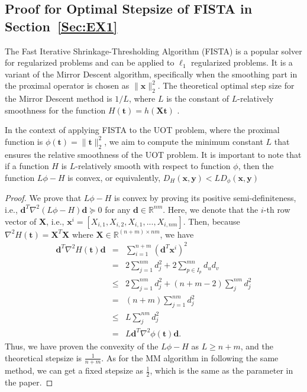 \documentclass[11pt]{article}
\newcommand{\R}{\mathbb{R}}
\newcommand{\mat}[1]{\mathbf{#1}}
\renewcommand{\vec}[1]{\bm{#1}}
\begin{document}
\subsection{Proof for Optimal Stepsize of FISTA in Section~\ref{Sec:EX1}}
The Fast Iterative Shrinkage-Thresholding Algorithm (FISTA)\cite{Beck_2009_SIAMIS} is a popular solver for regularized problems and can be applied to $\ell_1$ regularized problems. It is a variant of the Mirror Descent algorithm, specifically when the smoothing part in the proximal operator is chosen as $\|\vec{x}\|_2^2$. The theoretical optimal step size for the Mirror Descent method is $1/L$, where $L$ is the constant of $L$-relatively smoothness for the function $H(\vec{t}) = h(\mat{X} \vec{t})$ \cite{doi:10.1137/16M1099546}. 

In the context of applying FISTA to the UOT problem, where the proximal function is $\phi(\vec{t}) = \|\vec{t}\|_2^2$, we aim to compute the minimum constant $L$ that ensures the relative smoothness of the UOT problem. It is important to note that if a function $H$ is $L$-relatively smooth with respect to function $\phi$, then the function $L\phi - H$ is convex, or equivalently, $D_H(\vec{x}, \vec{y}) < LD_{\phi}(\vec{x}, \vec{y})$ \cite{bauschke2017descent}


\begin{proof}
We prove that $L\phi - H$ is convex by proving its positive semi-definiteness, i.e., $\vec{d}^T \nabla^2(L\phi - H)\vec{d} \succeq 0$ for any $\vec{d}\in{\mathbb{R}^{nm}}$. Here, we denote that the $i$-th row vector of $\mat{X}$, i.e., $\vec{x}^i = [X_{i,1},X_{i,2},X_{i,1},...,X_{i,nm}]$. Then, because $\nabla^2 H(\vec{t}) = \mat X^{T}\mat X$ where $\mat{X} \in \R^{(n+m) \times nm}$, we have
\begin{eqnarray*}
\vec{d}^{T}\nabla^2 H(\vec t)\vec{d} &=& \sum_{i=1}^{n+m}{(\vec{d}^{T}\vec{x}^i)^2}\\
&=& 2\sum_{j=1}^{nm} d_j^{2} + 2\sum_{p\in I_p}^{mn}{d_u d_v}\\
& \leq& 2\sum_{j=1}^{nm} d_j^{2} + (n+m - 2)\sum_{j}^{nm}{d_j^2}\\
&=& (n+m) \sum_{j=1}^{nm}d_j^{2}\\
&\leq& L \sum_{j}^{nm}{d_{j}^{2}}\\
&=& L \vec{d}^{T} \nabla^2 \phi(\vec t)\vec{d}.
\end{eqnarray*}
Thus, we have proven the convexity of the $L\phi - H$ as $L\geq n+m$, and the theoretical stepsize is $\frac{1}{n+m}$.
As for the MM algorithm in {\cite{Chapel_NeurIPS_2021}} following the same method, we can get a fixed stepsize as $\frac{1}{2}$, which is the same as the parameter in the paper.
\end{proof}
\end{document}
